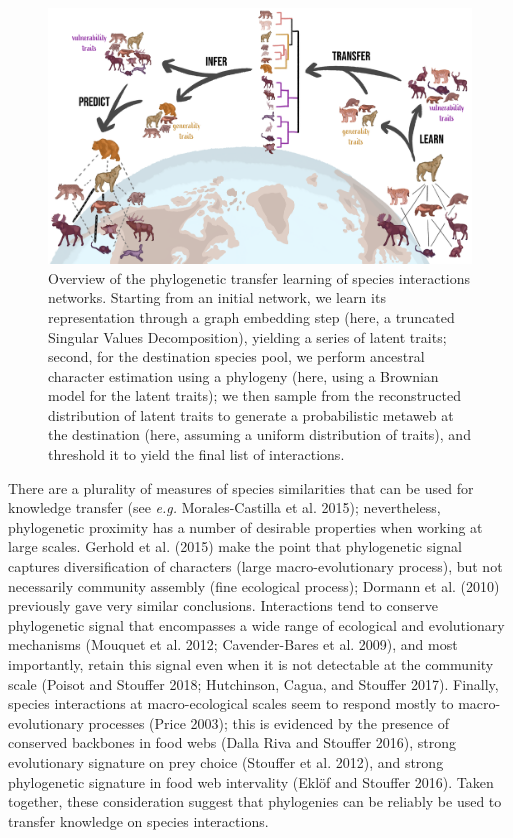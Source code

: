 \documentclass[10pt,oneside]{article}
\makeatletter
\def\maxwidth{\ifdim\Gin@nat@width>\linewidth\linewidth
\else\Gin@nat@width\fi}
\let\Oldincludegraphics\includegraphics
\renewcommand{\includegraphics}[1]{\Oldincludegraphics[width=\maxwidth]{#1}}
\makeatother
\begin{document}
\begin{figure}
\hypertarget{fig:concept}{%
\centering
\includegraphics{figures/figure-concept.png}
\caption{Overview of the phylogenetic transfer learning of species
interactions networks. Starting from an initial network, we learn its
representation through a graph embedding step (here, a truncated
Singular Values Decomposition), yielding a series of latent traits;
second, for the destination species pool, we perform ancestral character
estimation using a phylogeny (here, using a Brownian model for the
latent traits); we then sample from the reconstructed distribution of
latent traits to generate a probabilistic metaweb at the destination
(here, assuming a uniform distribution of traits), and threshold it to
yield the final list of interactions.}\label{fig:concept}
}
\end{figure}

There are a plurality of measures of species similarities that can be
used for knowledge transfer (see \emph{e.g.} Morales-Castilla et al.
2015); nevertheless, phylogenetic proximity has a number of desirable
properties when working at large scales. Gerhold et al. (2015) make the
point that phylogenetic signal captures diversification of characters
(large macro-evolutionary process), but not necessarily community
assembly (fine ecological process); Dormann et al. (2010) previously
gave very similar conclusions. Interactions tend to conserve
phylogenetic signal that encompasses a wide range of ecological and
evolutionary mechanisms (Mouquet et al. 2012; Cavender-Bares et al.
2009), and most importantly, retain this signal even when it is not
detectable at the community scale (Poisot and Stouffer 2018; Hutchinson,
Cagua, and Stouffer 2017). Finally, species interactions at
macro-ecological scales seem to respond mostly to macro-evolutionary
processes (Price 2003); this is evidenced by the presence of conserved
backbones in food webs (Dalla Riva and Stouffer 2016), strong
evolutionary signature on prey choice (Stouffer et al. 2012), and strong
phylogenetic signature in food web intervality (Eklöf and Stouffer
2016). Taken together, these consideration suggest that phylogenies can
be reliably be used to transfer knowledge on species interactions.
\end{document}
